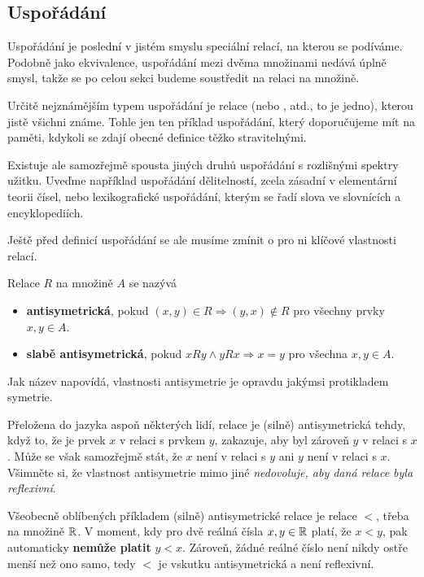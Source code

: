\subsection{Uspořádání}
\label{ssec:usporadani}

Uspořádání je poslední v jistém smyslu speciální relací, na kterou se podíváme.
Podobně jako ekvivalence, uspořádání mezi dvěma množinami nedává úplně smysl,
takže se po celou sekci budeme soustředit na relaci na množině.

Určitě nejznámějším typem uspořádání je relace  (ne\-bo
,  atd., to je jedno), kterou jistě všichni
známe. Tohle jen ten příklad uspořádání, který doporučujeme mít na paměti,
kdykoli se zdají obecné definice těžko stravitelnými.

Existuje ale samozřejmě spousta jiných druhů uspořádání s rozlišnými spektry
užitku. Uveďme například uspořádání dělitelností, zcela zásadní v elementární
teorii čísel, nebo lexikografické uspořádání, kterým se řadí slova ve slovnících
a encyklopediích.

Ještě před definicí uspořádání se ale musíme zmínit o pro ni klíčové vlastnosti
relací.

\begin{definition}
 Relace $R$ na množině $A$ se nazývá
 \begin{itemize}
  \item \textbf{antisymetrická}, pokud $(x,y) \in R \Rightarrow (y,x) \notin R$
   pro všechny prvky ${x,y \in A}$.
  \item \textbf{slabě antisymetrická}, pokud $xRy \wedge yRx \Rightarrow x=y$ 
   pro všechna $x,y \in A$.
 \end{itemize}
\end{definition}

Jak název napovídá, vlastnosti antisymetrie je opravdu jakýmsi protikladem
symetrie.

Přeložena do jazyka aspoň některých lidí, relace je (silně) antisymetrická
tehdy, když to, že je prvek $x$ v relaci s prvkem $y$, zakazuje, aby byl zároveň
$y$ v relaci s $x$. Může se však samozřejmě stát, že $x$ není v relaci s $y$ ani
$y$ není v relaci s $x$. Všimněte si, že vlastnost antisymetrie mimo jiné
\emph{nedovoluje, aby daná relace byla reflexivní}.

\begin{example}
 Všeobecně oblíbených příkladem (silně) antisymetrické relace je relace $<$,
 třeba na množině $\mathbb{R}$. V moment, kdy pro dvě reálná čísla $x,y \in \mathbb{R}$ platí,
 že $x<y$, pak automaticky \textbf{nemůže platit} $y<x$. Zároveň, žádné reálné
 číslo není nikdy ostře menší než ono samo, tedy $<$ je vskutku antisymetrická a
 není reflexivní.
\end{example}

